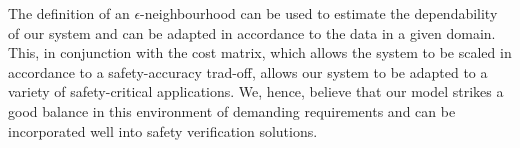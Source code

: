 \documentclass[acmsmall,nonacm]{acmart}
\begin{document}
The definition of an $\epsilon$-neighbourhood can be used to estimate the dependability of our system and can be adapted in accordance to the data in a given domain. This, in conjunction with the cost matrix, which allows the system to be scaled in accordance to a safety-accuracy trad-off, allows our system to be adapted to a variety of safety-critical applications. 
We, hence, believe that our model strikes a good balance in this environment of demanding requirements and can be incorporated well into safety verification solutions. %


\pagebreak  




\end{document}
